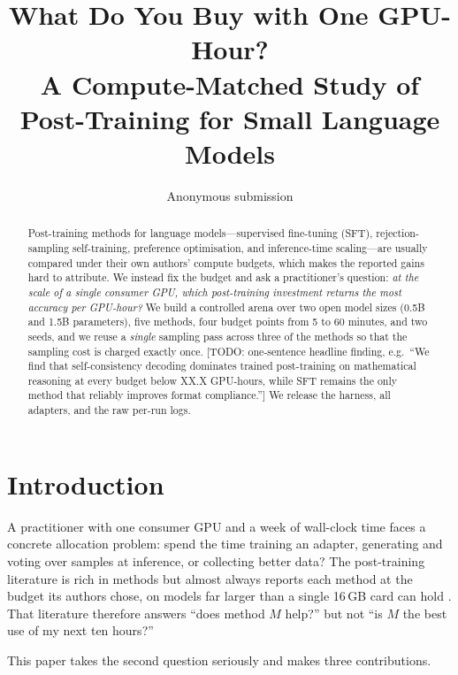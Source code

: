 \documentclass[11pt]{article}
\title{What Do You Buy with One GPU-Hour?\\
       A Compute-Matched Study of Post-Training for Small Language Models}
\author{Anonymous submission}
\date{}
\providecommand{\textcolor}[1]{}
\newcommand{\TODO}[1]{\textcolor{red}{[TODO: #1]}}
\newcommand{\XX}{XX.X}
\begin{document}
\maketitle

\begin{abstract}
Post-training methods for language models---supervised fine-tuning (SFT),
rejection-sampling self-training, preference optimisation, and inference-time
scaling---are usually compared under their own authors' compute budgets, which
makes the reported gains hard to attribute. We instead fix the budget and ask
a practitioner's question: \emph{at the scale of a single consumer GPU, which
post-training investment returns the most accuracy per GPU-hour?} We build a
controlled arena over two open model sizes (0.5B and 1.5B parameters), five
methods, four budget points from 5 to 60 minutes, and two seeds, and we reuse
a \emph{single} sampling pass across three of the methods so that the sampling
cost is charged exactly once. \TODO{one-sentence headline finding, e.g.\
``We find that self-consistency decoding dominates trained post-training on
mathematical reasoning at every budget below \XX{} GPU-hours, while SFT remains
the only method that reliably improves format compliance.''} We release the
harness, all adapters, and the raw per-run logs.
\end{abstract}

\section{Introduction}

A practitioner with one consumer GPU and a week of wall-clock time faces a
concrete allocation problem: spend the time training an adapter, generating and
voting over samples at inference, or collecting better data? The post-training
literature is rich in methods but almost always reports each method at the
budget its authors chose, on models far larger than a single 16\,GB card can
hold \cite{rafailov2023dpo,deepseek2025r1,lambert2024tulu3}. That literature
therefore answers ``does method $M$ help?'' but not ``is $M$ the best use of my
next ten hours?''

This paper takes the second question seriously and makes three contributions.
\end{document}

